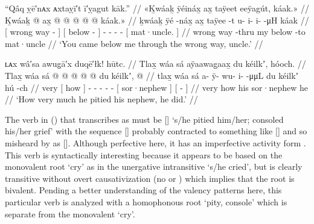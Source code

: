 \ex\label{ex:91-58-wrong-way-below-me-uncle}%
%
\begingl
	\glpreamble	“Qâq ỵē′nᴀx ᴀxtaỵī′t ī′ỵagut kāk.” //
	\glpreamble	«\!Ḵwáaḵ ÿéináx̱ ax̱ taÿeet eeÿagút, káak.\!» //
	\gla	{} Ḵwáaḵ  @ {} {}
		{} ax̱  @ {} {}
		 @ {} @ {} @ {} @ {} 
		{} káak.\!» {} //
	\glb	{} ḵwáaḵ ÿé -náx̱ {}
		{} ax̱ taÿee -t {}
		u- i- i-  -μH
		{} káak {} //
	\glc	{}[ wrong way - {}]
		{}[  below - {}]
		- - -  -
		{}[ mat·uncle. {}] //
	\gld	{} wrong way -thru {}
		{} my below -to {}
		 {} {} {} {}
		{} mat·uncle {} //
	\glft	‘You came below me through the wrong way, uncle.’
		//
\endgl
\xe

\ex\label{ex:91-59-pitied-nephew}%
%
\begingl
	\glpreamble	ʟᴀx wâ′sa awug̣ā′x duqē′łk! hūtc. //
	\glpreamble	Tlax̱ wáa sá aÿaawag̱aax̱ du kéilkʼ, hóoch. //
	\gla	Tlax̱ {} wáa sá {}
		 @ {} @ {} @ {} @ {} @ {}
		{} du kéilkʼ, {}
		{}  @ {} {} //
	\glb	tlax̱ {} wáa sá {}
		a- ÿ- wu- i-  -μμL
		{} du kéilkʼ {}
		{} hú -ch {} //
	\glc	very {}[ how  {}]
		- - - -  -
		{}[  sor·nephew {}]
		{}[  - {}] //
	\gld	very {} how {} {}
		 {} {} {} {} {}
		{} his sor·nephew {}
		{} he {} {} //
	\glft	‘How very much he pitied his nephew, he did.’
		//
\endgl
\xe

The verb in (\lastx) that \citeauthor{swanton:1909} transcribes as  must be  [] ‘s/he pitied him/her; consoled his/her grief’ with the sequence  [] probably contracted to something like [] and so misheard by \citeauthor{swanton:1909} as [].
Although perfective here, it has an imperfective activity form  \parencites[f02/130]{leer:1973}[831]{leer:1976}.
This verb is syntactically interesting because it appears to be based on the monovalent root  ‘cry’ as in the unergative intransitive  ‘s/he cried’, but  is clearly transitive without overt causativization (no  or ) which implies that the root is bivalent.
Pending a better understanding of the valency patterns here, this particular verb is analyzed with a homophonous root  ‘pity, console’ which is separate from the monovalent  ‘cry’.

